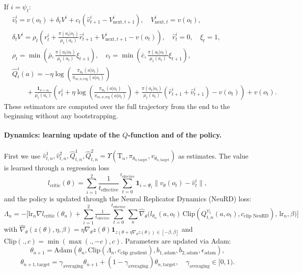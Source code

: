 If $i = \psi_t$:
\begin{align*}
&\hat v^i_t = v(o_{t}) + \delta_t V^i + c_t (\hat v^i_{t+1}-V^i_{\textrm{next},t+1}),\quad V^i_{\textrm{next},t} = v(o_{t}),\\
&\delta_t V^i = \rho_t \!\left( r^i_t + \frac{\pi(a_t|o_t)}{\mu_t(a_t)} \hat r^i_{t+1} + V^i_{\textrm{next},t+1} - v(o_{t})\right),\quad \hat r^i_t = 0,\quad \xi_t = 1,\\
&\rho_t = \min\!\left(\bar \rho, \tfrac{\pi(a_t|o_t)}{\mu_t(a_t)}\xi_{t+1}\right),\quad c_t = \min\!\left(\bar c, \tfrac{\pi(a_t|o_t)}{\mu_t(a_t)}\xi_{t+1}\right),\\
&\hat Q^i_t (a) = -\eta\log\!\left(\tfrac{\pi_{\theta_n}(a|o_t)}{\pi_{m, n, \textrm{reg}}(a|o_t)}\right)\\
&\qquad + \frac{\mathbf{1}_{a=a_t}}{\mu_t(a_t)}\!\left(r^i_t + \eta\log\!\left(\tfrac{\pi_{\theta_n}(a|o_t)}{\pi_{m, n, \textrm{reg}}(a|o_t)}\right) + \tfrac{\pi(a_t|o_t)}{\mu_t(a_t)} (\hat r^i_{t+1} + \hat v^i_{t+1})-v(o_{t})\right)+v(o_{t}).
\end{align*}
These estimators are computed over the full trajectory from the end to the beginning without any bootstrapping.

\paragraph{Dynamics: learning update of the $Q$-function and of the policy.}
First we use $\hat v^1_{t,n}, \hat v^2_{t,n}, \hat Q^1_{t,n}, \hat Q^2_{t,n} = \Upsilon(\mathrm{T}_n,  \pi_{\theta_{n, \textrm{target}}}, v_{\theta_{n, \textrm{target}}})$ as estimates. The value is learned through a regression loss
$$l_{\textrm{critic}}(\theta) = \sum_{i=1}^2 \frac{1}{t_{\textrm{effective}}}\sum_{t=0}^{t_{\textrm{effective}}}\mathbf{1}_{i=\Psi_t}\|v_{\theta}(o_t)-\hat v^i_t\|,$$
and the policy is updated through the Neural Replicator Dynamics (NeuRD) loss:
$$\Lambda_n = -\Big[\textrm{lr}_n \nabla l_{\textrm{critic}}(\theta_n) + \sum_{i=1}^2 \tfrac{1}{t_{\textrm{effective}}}\sum_{t=0}^{t_{\textrm{effective}}} \sum_a \hat\nabla_\theta\big(l_{\theta_n}(a, o_t)\,\textrm{Clip}(Q^{\psi_t}_{t,n}(a, o_t), c_{\textrm{clip NeuRD}}),\, \textrm{lr}_n, \beta\big)\Big]$$
with $\hat\nabla_\theta(z(\theta), \eta, \beta) = \eta \nabla_\theta z(\theta) \mathbf{1}_{z(\theta + \eta \nabla_\theta z(\theta))\in [-\beta, \beta]}$ and $\textrm{Clip}(.,c) = \min(\max(.,-c),c)$. Parameters are updated via Adam:
$$\theta_{n+1}=\textrm{Adam}(\theta_n, \textrm{Clip}(\Lambda_n, c_{\textrm{clip gradient}}), b_{1,\textrm{adam}}, b_{2,\textrm{adam}}, \epsilon_{\textrm{adam}}),$$
$$\theta_{n+1,\textrm{target}} = \gamma_{\textrm{averaging}}\theta_{n+1}+(1-\gamma_{\textrm{averaging}})\theta_{n,\textrm{target}}, \quad \gamma_{\textrm{averaging}}\in[0, 1).$$

